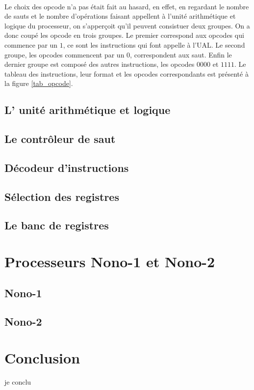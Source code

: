 \documentclass[a4paper]{article}
\begin{document}
			\paragraph{}{
			Le choix des opcode n'a pas était fait au hasard, en effet, en regardant le nombre
			de sauts et le nombre d'opérations faisant appellent à l'unité arithmétique et logique
			du processeur, on s'apperçoit qu'il peuvent consistuer deux groupes. On a donc coupé
			les opcode en trois groupes. Le premier correspond aux opcodes qui commence par un $1$,
			ce sont les instructions qui font appelle à l'UAL. \newline
			Le second groupe, les opcodes commencent par un $0$, correspondent aux saut. Enfin 
			le dernier groupe est composé des autres instructions, les opcodes $0000$ et $1111$.
			Le tableau des instructions, leur format et les opcodes correspondants est présenté
			à la figure \ref{tab_opcode}.
			}
	
		\subsection{L' unité arithmétique et logique}
			
			
		\subsection{Le contrôleur de saut}
			
			
		\subsection{Décodeur d'instructions}
			
			
		\subsection{Sélection des registres}
			
			
		\subsection{Le banc de registres}
			
	
	\newpage	
	\section{Processeurs Nono-1 et Nono-2}
		\subsection{Nono-1}
		\subsection{Nono-2}
	

	
	
	\newpage
	\section*{Conclusion}
		\paragraph{}{je conclu}
		
\end{document}
